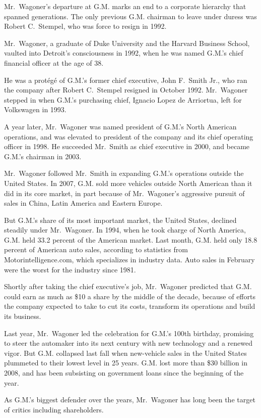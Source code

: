 \documentclass[12pt,a4paper,onecolumn]{article}
\begin{document}
Mr.~Wagoner's departure at G.M. marks an end to a corporate hierarchy that spanned generations. The
only previous G.M. chairman to leave under duress was Robert C.~Stempel, who was force to resign in
1992.

Mr.~Wagoner, a graduate of Duke University and the Harvard Business School, vaulted into Detroit's
consciousness in 1992, when he was named G.M.'s chief financial officer at the age of 38.

He was a prot\'eg\'e of G.M.'s former chief executive, John F.~Smith Jr., who ran the company after
Robert C.~Stempel resigned in October 1992. Mr.~Wagoner stepped in when G.M.'s purchasing chief,
Ignacio Lopez de Arriortua, left for Volkswagen in 1993.

A year later, Mr.~Wagoner was named president of G.M.'s North American operations, and was elevated
to president of the company and its chief operating officer in 1998. He succeeded Mr.~Smith as chief
executive in 2000, and became G.M.'s chairman in 2003.

Mr.~Wagoner followed Mr.~Smith in expanding G.M.'s operations outside the United States. In 2007,
G.M. sold more vehicles outside North American than it did in its core market, in part because of
Mr.~Wagoner's aggressive pursuit of sales in China, Latin America and Eastern Europe.

But G.M.'s share of its most important market, the United States, declined steadily under
Mr.~Wagoner. In 1994, when he took charge of North America, G.M. held 33.2 percent of the American
market. Last month, G.M. held only 18.8 percent of American auto sales, according to statistics from
Motorintelligence.com, which specializes in industry data. Auto sales in February were the worst for
the industry since 1981.

Shortly after taking the chief executive's job, Mr.~Wagoner predicted that G.M. could earn as much
as \$10 a share by the middle of the decade, because of efforts the company expected to take to cut
its costs, transform its operations and build its business.

Last year, Mr.~Wagoner led the celebration for G.M.'s 100th birthday, promising to steer the
automaker into its next century with new technology and a renewed vigor. But G.M. collapsed last
fall when new-vehicle sales in the United States plummeted to their lowest level in 25 years. G.M.
lost more than \$30 billion in 2008, and has been subsisting on government loans since the beginning
of the year.

As G.M.'s biggest defender over the years, Mr.~Wagoner has long been the target of critics including
shareholders.
\end{document}
